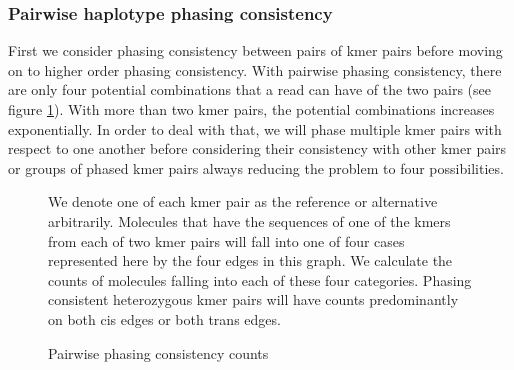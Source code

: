 \subsubsection{Pairwise haplotype phasing consistency}
\par{
First we consider phasing consistency between pairs of kmer pairs before moving on to higher order phasing consistency. With pairwise phasing consistency, there are only four potential combinations that a read can have of the two pairs (see figure \ref{figure:consistency}). With more than two kmer pairs, the potential combinations increases exponentially. In order to deal with that, we will phase multiple kmer pairs with respect to one another before considering their consistency with other kmer pairs or groups of phased kmer pairs always reducing the problem to four possibilities.
}


\begin{figure}[htbp!]
\caption{Pairwise phasing consistency counts}\label{figure:consistency}
\centering
{}
\par{
We denote one of each kmer pair as the reference or alternative arbitrarily. Molecules that have the sequences of one of the kmers from each of two kmer pairs will fall into one of four cases represented here by the four edges in this graph. We calculate the counts of molecules falling into each of these four categories. Phasing consistent heterozygous kmer pairs will have counts predominantly on both cis edges or both trans edges.
}
\end{figure}

